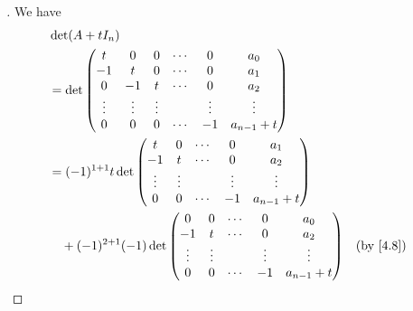 \begin{proof}[]
  We have
  \begin{align*}
     & \det(A + t I_n)                                                                                                                \\
     & = \det\begin{pmatrix}
               t      & 0      & 0      & \cdots & 0      & a_0           \\
               -1     & t      & 0      & \cdots & 0      & a_1           \\
               0      & -1     & t      & \cdots & 0      & a_2           \\
               \vdots & \vdots & \vdots &        & \vdots & \vdots        \\
               0      & 0      & 0      & \cdots & -1     & a_{n - 1} + t
             \end{pmatrix}                                                               \\
     & = (-1)^{1 + 1} t \det\begin{pmatrix}
                              t      & 0      & \cdots & 0      & a_1           \\
                              -1     & t      & \cdots & 0      & a_2           \\
                              \vdots & \vdots &        & \vdots & \vdots        \\
                              0      & 0      & \cdots & -1     & a_{n - 1} + t
                            \end{pmatrix}                                                         \\
     & \quad + (-1)^{2 + 1} (-1) \det\begin{pmatrix}
                                       0      & 0      & \cdots & 0      & a_0           \\
                                       -1     & t      & \cdots & 0      & a_2           \\
                                       \vdots & \vdots &        & \vdots & \vdots        \\
                                       0      & 0      & \cdots & -1     & a_{n - 1} + t
                                     \end{pmatrix}                                            &  & \text{(by \cref{4.8})}             \\

\end{align*}
\end{proof}
